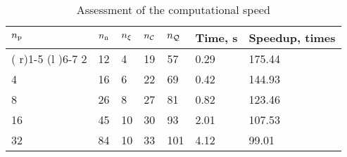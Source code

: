 \begin{table}[t]
  \centering
  \caption{Assessment of the computational speed}
  \vspace{-0.5em}
  \begin{tabular*}{1\linewidth}{R{10pt}R{16pt}R{16pt}R{16pt}R{16pt}R{44pt}R{49pt}}
    \toprule
    ${n_\text{p}}$ & ${n_\text{n}}$ & ${n_\xi}$ & ${n_\mathcal{C}}$ & ${n_\mathcal{Q}}$ & Time, s & Speedup, times \\
    \cmidrule( r){1-5}
    \cmidrule(l ){6-7}
     2 & 12 &  4 & 19 &  57 & 0.29 & 175.44 \\
     4 & 16 &  6 & 22 &  69 & 0.42 & 144.93 \\
     8 & 26 &  8 & 27 &  81 & 0.82 & 123.46 \\
    16 & 45 & 10 & 30 &  93 & 2.01 & 107.53 \\
    32 & 84 & 10 & 33 & 101 & 4.12 &  99.01 \\
    \bottomrule
  \end{tabular*}
\end{table}
